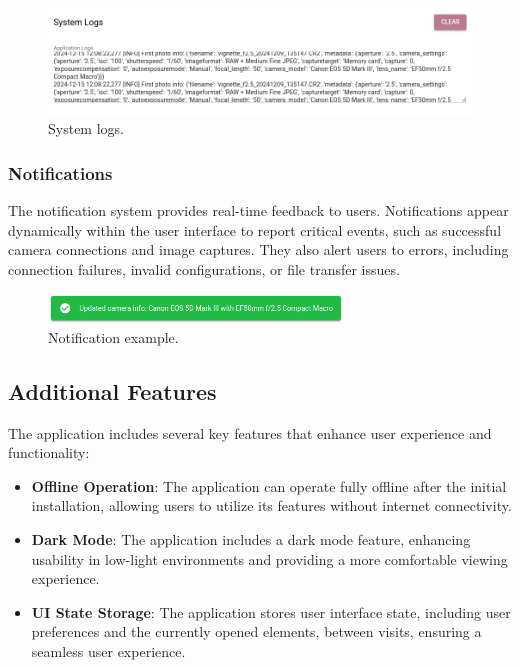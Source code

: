 \begin{figure}[h]
\centering
\includegraphics[width=1\textwidth]{Images/system_logs.png}
\caption{System logs.}
\label{fig:ui_system_logs}
\end{figure}

\subsubsection{Notifications}
The notification system provides real-time feedback to users. Notifications appear dynamically within the user interface to report critical events, such as successful camera connections and image captures. They also alert users to errors, including connection failures, invalid configurations, or file transfer issues.

\begin{figure}[h]
\centering
\includegraphics[width=0.7\textwidth]{Images/notification.png}
\caption{Notification example.}
\label{fig:ui_notification}
\end{figure}


\subsection{Additional Features}
The application includes several key features that enhance user experience and functionality:
\begin{itemize}
    \item \textbf{Offline Operation}: The application can operate fully offline after the initial installation, allowing users to utilize its features without internet connectivity.
    \item \textbf{Dark Mode}: The application includes a dark mode feature, enhancing usability in low-light environments and providing a more comfortable viewing experience.
    \item \textbf{UI State Storage}: The application stores user interface state, including user preferences and the currently opened elements, between visits, ensuring a seamless user experience.
\end{itemize}

